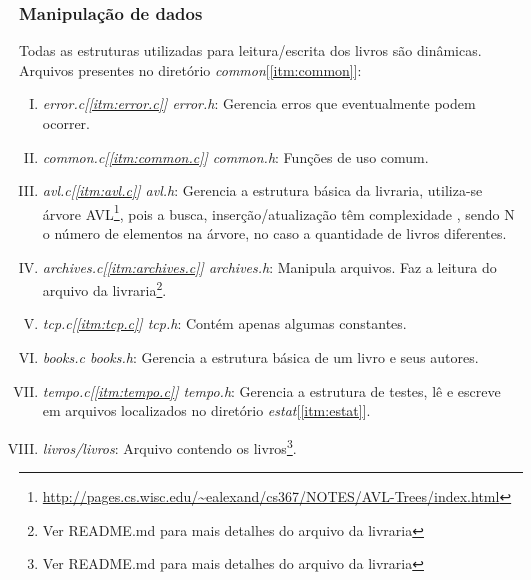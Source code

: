 \documentclass[a4paper,10pt]{article}
\begin{document}
\subsubsection{Manipulação de dados}
Todas as estruturas utilizadas para leitura/escrita dos livros são dinâmicas. 
\\Arquivos presentes no diretório \emph{common}[\ref{itm:common}]:
\begin{enumerate}[I.]
\item \emph{error.c[\ref{itm:error.c}] error.h}: Gerencia erros que eventualmente podem ocorrer.
\item \emph{common.c[\ref{itm:common.c}] common.h}: Funções de uso comum.
\item \label{itm:avl} \emph{avl.c[\ref{itm:avl.c}] avl.h}: Gerencia a estrutura básica da livraria, utiliza-se 
árvore AVL\footnote{ \url{http://pages.cs.wisc.edu/~ealexand/cs367/NOTES/AVL-Trees/index.html} }, pois a busca, 
inserção/atualização têm complexidade  , sendo N
o número de elementos na árvore, no caso a quantidade de livros diferentes.
\item \emph{archives.c[\ref{itm:archives.c}] archives.h}: Manipula arquivos. Faz a leitura do arquivo
da livraria\footnote{Ver README.md para mais detalhes do arquivo da livraria}.
\item \label{itm:tcp} \emph{tcp.c[\ref{itm:tcp.c}] tcp.h}: Contém apenas algumas constantes.
\item \emph{books.c books.h}: Gerencia a estrutura básica de um livro e seus autores.
\item \label{itm:tempo}\emph{tempo.c[\ref{itm:tempo.c}] tempo.h}: Gerencia a estrutura de testes, lê e escreve em arquivos localizados no diretório \emph{estat}[\ref{itm:estat}].
\item \emph{livros/livros}: Arquivo contendo os livros\footnote{Ver README.md para mais detalhes do arquivo da livraria}.
\end{enumerate}
\end{document}
